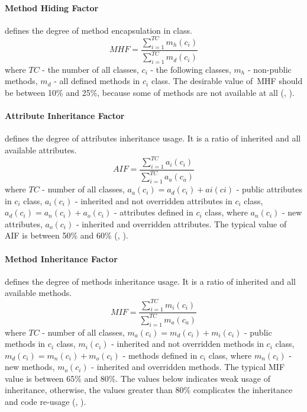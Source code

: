 \paragraph{Method Hiding Factor} defines the degree of method encapsulation in class.
\begin{equation}
MHF=\frac { \sum _{ i=1 }^{ TC }{ { m }_{ h }({ c }_{ i }) }  }{ \sum _{ i=1 }^{ TC }{ { m }_{ d }({ c }_{ i }) }  } 
\end{equation}
where $TC$ - the number of all classes, $c_{i}$ - the following classes, $m_{h}$ - non-public methods, $m_{d}$ - all defined methods in $c_{i}$ class. The desirable value of~\ac{MHF} should be between 10\% and 25\%, because some of methods are not available at all (\cite{moodbook}, \cite{nasa}).


\paragraph{Attribute Inheritance Factor} defines the degree of attributes inheritance usage. It is a ratio of inherited and all available attributes. 
\begin{equation}
AIF=\frac { \sum _{ i=1 }^{ TC }{ { a }_{ i }({ c }_{ i }) }  }{ \sum _{ i=1 }^{ TC }{ { a }_{ a }({ c }_{ a }) }  } 
\end{equation}
where $TC$ - number of all classes, $a_{a}(c_{i}) = a_{d}(c_{i}) + a{i}(c{i})$ - public attributes in $c_{i}$ class, $a_{i}(c_{i})$ - inherited and not overridden attributes in $c_{i}$ class, $a_{d}(c_{i}) = a_{n}(c_{i}) + a_{o}(c_{i})$ - attributes defined in $c_{i}$ class, where $a_{n}(c_{i})$ - new attributes, $a_{o}(c_{i})$  - inherited and overridden attributes. The typical value of \ac{AIF} is between 50\% and 60\% (\cite{moodbook}, \cite{nasa}).  


\paragraph{Method Inheritance Factor} defines the degree of methods inheritance usage. It is a ratio of inherited and all available methods. 
\begin{equation}
MIF=\frac { \sum _{ i=1 }^{ TC }{ { m }_{ i }({ c }_{ i }) }  }{ \sum _{ i=1 }^{ TC }{ { m }_{ a }({ c }_{ a }) }  } 
\end{equation}
where $TC$ - number of all classes, $m_{a}(c_{i}) = m_{d}(c_{i}) + m_{i}(c_{i})$ - public methods in $c_{i}$ class, $m_{i}(c_{i})$ - inherited and not overridden methods in $c_{i}$ class, $m_{d}(c_{i}) = m_{n}(c_{i}) + m_{o}(c_{i})$ - methods defined in $c_{i}$ class, where $m_{n}(c_{i})$ - new methods, $m_{o}(c_{i})$  - inherited and overridden methods. The typical \ac{MIF} value is between 65\% and 80\%. The values below indicates weak usage of inheritance, otherwise, the values greater than 80\% complicates the inheritance and code re-usage (\cite{moodbook}, \cite{nasa}).   


